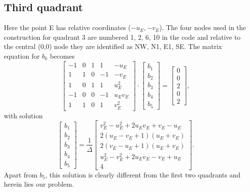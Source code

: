 \documentclass[12pt,letterpaper,margin=0.5in]{report}
\begin{document}
\subsection{Third quadrant}
Here the point E has relative coordinates ($-u_E, -v_E$).  The four nodes used in the
construction for quadrant 3 are numbered 1, 2, 6, 10 in the code and relative to the central (0,0) node they
are identified as NW, N1, E1, SE. The matrix equation for $b_k$ becomes
\begin{equation}
\left[ {\begin{array}{*{20}{r}}
{ - 1}&0&1&1&{ - {u_E}}\\
1&1&0&{ - 1}&{ - {v_E}}\\
1&0&1&1&{u_E^2}\\
{ - 1}&0&0&{ - 1}&{{u_E}{v_E}}\\
1&1&0&1&{v_E^2}
\end{array}} \right] \cdot \left[ {\begin{array}{*{20}{c}}
{{b_1}}\\
{{b_2}}\\
{{b_3}}\\
{{b_4}}\\
{{b_5}}
\end{array}} \right] = \left[ {\begin{array}{*{20}{c}}
0\\
0\\
2\\
0\\
2
\end{array}} \right],
\end{equation}
with solution
\begin{equation}
\left[ {\begin{array}{*{20}{c}}
{{b_1}}\\
{{b_2}}\\
{{b_3}}\\
{{b_4}}\\
{{b_5}}
\end{array}} \right] = \frac{1}{\Delta }\left[ {\begin{array}{*{20}{c}}
{v_E^2 - u_E^2 + 2{u_E}{v_E} + {v_E} - {u_E}}\\[4pt]
{2\left( {{u_E} - {v_E} + 1} \right)\left( {{u_E} + {v_E}} \right)}\\[4pt]
{2\left( {{v_E} - {u_E} + 1} \right)\left( {{u_E} + {v_E}} \right)}\\[4pt]
{u_E^2 - v_E^2 + 2{u_E}{v_E} - {v_E} + {u_E}}\\[4pt]
4
\end{array}} \right].
\end{equation}
Apart from $b_5$, this solution is clearly different from the first two quadrants and herein lies our problem.
\end{document}
